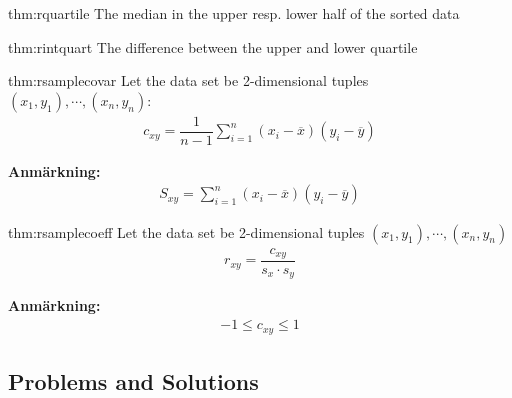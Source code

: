 \par\bigskip
\begin{theo}{thm:rquartile}
  The median in the upper resp. lower half of the sorted data 
\end{theo}
\par\bigskip
\begin{theo}{thm:rintquart}
  The difference between the upper and lower quartile 
\end{theo}
\par\bigskip
\begin{theo}{thm:rsamplecovar}
  Let the data set be 2-dimensional tuples $(x_1,y_1),\cdots,(x_n,y_n)$:
  \begin{equation*}
    \begin{gathered}
      c_{xy} = \dfrac{1}{n-1}\sum_{i=1}^{n}(x_i-\overline{x})(y_i-\overline{y})
    \end{gathered}
  \end{equation*}
\end{theo}
\par\bigskip
\noindent\textbf{Anmärkning:}
\begin{equation*}
  \begin{gathered}
    S_{xy} = \sum_{i=1}^{n}(x_i-\overline{x})(y_i-\overline{y})
  \end{gathered}
\end{equation*}
\newpage
\begin{theo}{thm:rsamplecoeff}
  Let the data set be 2-dimensional tuples $(x_1,y_1),\cdots,(x_n,y_n)$ 
  \begin{equation*}
    \begin{gathered}
      r_{xy} = \dfrac{c_{xy}}{s_x\cdot s_y}
    \end{gathered}
  \end{equation*}
\end{theo}
\par\bigskip
\noindent\textbf{Anmärkning:}
\begin{equation*}
  \begin{gathered}
    -1\leq c_{xy}\leq 1
  \end{gathered}
\end{equation*}
\par\bigskip
\subsection{Problems and Solutions}\hfill\\
